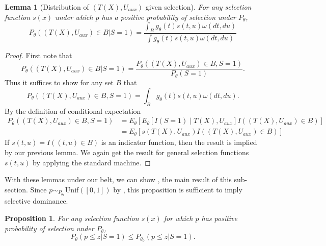 \documentclass{article}
\newtheorem{lemma}{Lemma}
\newtheorem{proposition}{Proposition}
\begin{document}
\begin{appendix}
\begin{lemma}[Distribution of $(T(X), U_{aux})$ given selection]
    \label{lem:cond_dist}
    For any selection function $s(x)$ under which $p$ has a positive probability of selection under $P_{\theta}$, 
    \begin{equation*}
        P_{\theta}((T(X), U_{aux}) \in B| S = 1 ) = \frac{\int_{B} g_{\theta}(t)s(t, u) \omega(dt, du)}{ \int g_{\theta}(t) s(t, u) \omega(dt, du) }
    \end{equation*}
\end{lemma}

\begin{proof} First note that
    \begin{equation*}
        P_{\theta}( (T(X), U_{aux}) \in B | S= 1 ) = \frac{P_{\theta}((T(X), U_{aux}) \in B, S = 1) }{P_{\theta}(S = 1)}.
    \end{equation*} 
    Thus it suffices to show for any set $B$ that 
    \begin{equation*}
        P_{\theta}( (T(X), U_{aux}) \in B,  S= 1 ) = \int_B g_{\theta}(t) s(t, u) \omega(dt, du). 
    \end{equation*} 
    By the definition of conditional expectation
    \begin{align*}
        P_{\theta}( (T(X), U_{aux}) \in B,  S= 1 ) &= E_{\theta}[E_{\theta}[ I(S=1) \mid  T(X), U_{aux}] I((T(X), U_{aux}) \in B) ]\\
                                                   &= E_{\theta}[ s(T(X), U_{aux}) I((T(X), U_{aux}) \in B) ]
    \end{align*}
    If $s(t, u) = I((t, u) \in B)$ is an indicator function, then the result is implied by our previous lemma. We again get the result for general selection functions $s(t, u)$ by applying the standard machine. 
\end{proof}


With these lemmas under our belt, we can show , the main result of this sub-section. Since $p \sim_{P_{\theta_0}} \text{Unif}([0, 1])$ by , this proposition is sufficient to imply selective dominance. 

\begin{proposition}
    \label{prop:mlr_sel_dom}
    For any selection function $s(x)$ for which $p$ has positive probability of selection under $P_{\theta}$,  
    \begin{equation*}
        P_{\theta}(p \leq z | S = 1)  \leq P_{\theta_0}(p \leq z | S = 1).
    \end{equation*}
\end{proposition}


\end{appendix}
\end{document}
